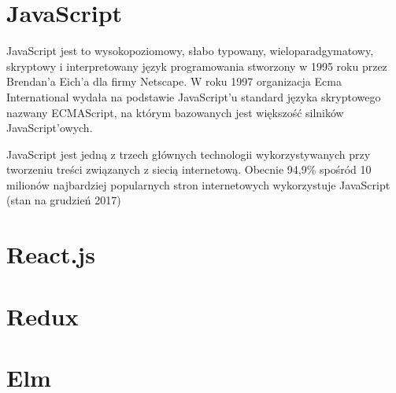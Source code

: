\section{JavaScript}
JavaScript jest to wysokopoziomowy, słabo typowany, wieloparadgymatowy, skryptowy i interpretowany język programowania stworzony w 1995 roku przez Brendan'a Eich'a dla firmy Netscape.  W roku 1997 organizacja Ecma International wydała na podstawie JavaScript'u standard języka skryptowego nazwany ECMAScript, na którym bazowanych jest większość silników JavaScript'owych.

JavaScript jest jedną z trzech głównych technologii wykorzystywanych przy tworzeniu treści związanych z siecią internetową. Obecnie 94,9\% spośród 10 milionów najbardziej popularnych stron internetowych wykorzystuje JavaScript (stan na grudzień 2017\cite{JSUsage})
\section{React.js}

\section{Redux}

\section{Elm}